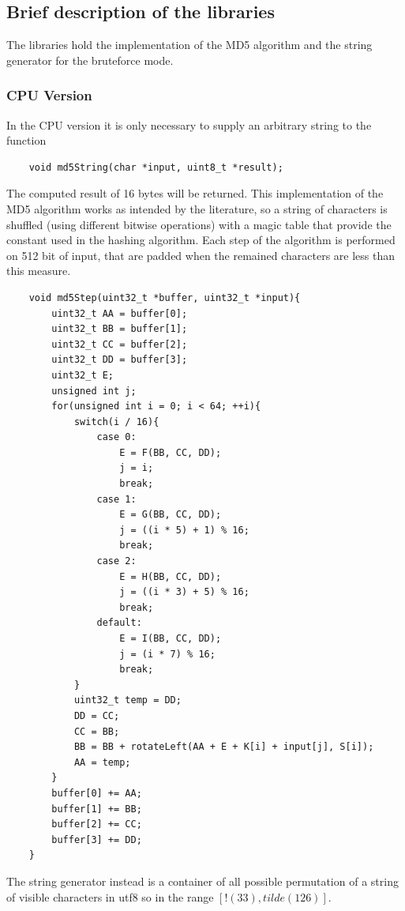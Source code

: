 \documentclass[12pt,a4paper]{article}
\begin{document}
\subsection{Brief description of the libraries}
The libraries hold the implementation of the MD5 algorithm and the string generator for the bruteforce mode.

\subsubsection{CPU Version}
In the CPU version it is only necessary to supply an arbitrary string to the function 
\begin{lstlisting}
    void md5String(char *input, uint8_t *result);
\end{lstlisting}

The computed result of 16 bytes will be returned. This implementation of the MD5 algorithm works as intended by the literature, so a string of characters is shuffled (using different bitwise operations) with a magic table that provide the constant used in the hashing algorithm. Each step of the algorithm is performed on 512 bit of input, that are padded when the remained characters are less than this measure.

\begin{lstlisting}
    void md5Step(uint32_t *buffer, uint32_t *input){
        uint32_t AA = buffer[0];
        uint32_t BB = buffer[1];
        uint32_t CC = buffer[2];
        uint32_t DD = buffer[3];
        uint32_t E;
        unsigned int j;
        for(unsigned int i = 0; i < 64; ++i){
            switch(i / 16){
                case 0:
                    E = F(BB, CC, DD);
                    j = i;
                    break;
                case 1:
                    E = G(BB, CC, DD);
                    j = ((i * 5) + 1) % 16;
                    break;
                case 2:
                    E = H(BB, CC, DD);
                    j = ((i * 3) + 5) % 16;
                    break;
                default:
                    E = I(BB, CC, DD);
                    j = (i * 7) % 16;
                    break;
            }
            uint32_t temp = DD;
            DD = CC;
            CC = BB;
            BB = BB + rotateLeft(AA + E + K[i] + input[j], S[i]);
            AA = temp;
        }
        buffer[0] += AA;
        buffer[1] += BB;
        buffer[2] += CC;
        buffer[3] += DD;
    }
\end{lstlisting}

The string generator instead is a container of all possible permutation of a string of visible characters in utf8 so in the range $ [!(33) , tilde (126)]$. 
\end{document}
